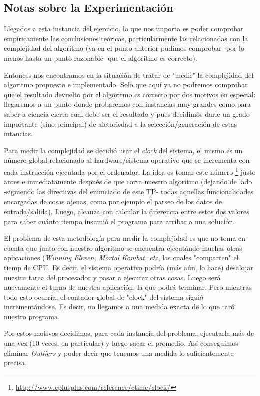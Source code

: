 {}
\subsection*{Notas sobre la Experimentaci\'on}\label{aclaraciones}
	\par Llegados a esta instancia del ejercicio, lo que nos importa es poder
		comprobar emp\'iricamente las conclusiones te\'oricas, particularmente
		las relacionadas con la complejidad del algoritmo (ya en el punto anterior
		pudimos comprobar -por lo menos hasta un punto razonable- que el algoritmo
		es correcto). 
	\par Entonces nos encontramos en la situaci\'on de tratar de "medir"
		la complejidad del algoritmo propuesto e implementado. Solo que aqu\'i ya no podremos
		comprobar que el resultado devuelto por el algoritmo es correcto por dos
		motivos en especial: llegaremos a un punto donde probaremos con instancias
		muy grandes como para saber a ciencia cierta cual debe ser el resultado y
		pues decidimos darle un grado importante (sino principal) de aletoriedad
		a la selecci\'on/generaci\'on de estas intancias.
	\par Para medir la complejidad se decidi\'o usar el \emph{clock} del sistema,
		el mismo es un n\'umero global relacionado al hardware/sistema operativo
		que se incrementa con cada instrucci\'on ejecutada por el ordenador. La idea
		es tomar este n\'umero \footnote{\url{http://www.cplusplus.com/reference/ctime/clock/}}
		justo antes e inmediatamente despu\'es de que corra nuestro algoritmo 
		(dejando de lado -siguiendo las directivas del enunciado de este TP- 
		todas aquellas funcionalidades encargadas de cosas ajenas, como
		por ejemplo el parseo de los datos de entrada/salida). Luego, alcanza con
		calcular la diferencia entre estos dos valores para saber cu\'anto tiempo
		insumi\'o el programa para arribar a una soluci\'on.
	\par El problema de esta metodolog\'ia para medir la complejidad es que no
		toma en cuenta que junto con nuestro algoritmo se encuentra ejecut\'ando
		muchas otras aplicaciones (\emph{Winning Eleven, Mortal Kombat, etc}, las
		cuales "comparten" el tiemp de CPU. Es decir, el sistema operativo podr\'ia
		(m\'as a\'un, lo hace) desalojar nuestra tarea del procesador y pasar a
		ejecutar otras cosas. Luego ser\'a nuevamente el turno de nuestra
		aplicaci\'on, la que podr\'a terminar. Pero mientras todo esto ocurr\'ia,
		el contador global de "clock" del sistema sigui\'o increment\'andose. Es
		decir, no llegamos a una medida exacta de lo que tar\'o nuestro programa.
	\par Por estos motivos decidimos, para cada instancia del problema, ejecutarla
		m\'as de una vez (10 veces, en particular) y luego sacar el promedio. As\'i 
		conseguimos eliminar \emph{Outliers} y poder decir que tenemos una medida
		lo suficientemente precisa.
